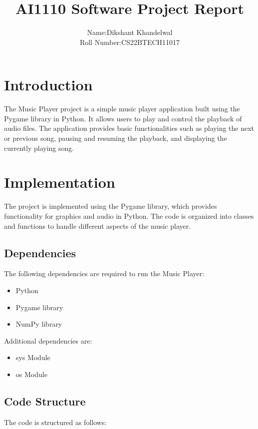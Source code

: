 \documentclass{article}
\begin{document}
\title{AI1110 Software Project Report}
\author{Name:Dikshant Khandelwal\\
        Roll Number:CS22BTECH11017}

\maketitle

\section{Introduction}
The Music Player project is a simple music player application built using the Pygame library in Python. It allows users to play and control the playback of audio files. The application provides basic functionalities such as playing the next or previous song, pausing and resuming the playback, and displaying the currently playing song.

\section{Implementation}
The project is implemented using the Pygame library, which provides functionality for graphics and audio in Python. The code is organized into classes and functions to handle different aspects of the music player.

\subsection{Dependencies}
The following dependencies are required to run the Music Player:
\begin{itemize}
\item Python 
\item Pygame library
\item NumPy library
\end{itemize}
Additional dependencies are:
\begin{itemize}
        \item sys Module
        \item os Module
\end{itemize}

\subsection{Code Structure}
The code is structured as follows:
\end{document}
